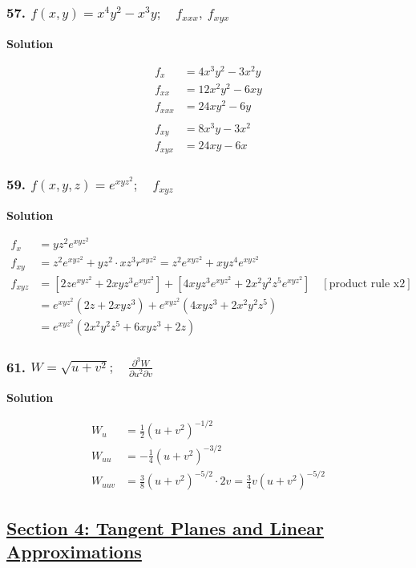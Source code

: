 \documentclass{article}
\newcommand{\solution}{\centerline{\textbf{Solution}}}
\begin{document}
\subsubsection*{57. $f(x,y) = x^4y^2 - x^3y;\quad f_{xxx},\: f_{xyx}$}
\solution
\begin{align*}
    f_x &= 4x^3y^2 - 3x^2y \\
    f_{xx} &= 12x^2y^2 - 6xy \\
    f_{xxx} &= 24xy^2 - 6y \\\\
    f_{xy} &= 8x^3y - 3x^2 \\
    f_{xyx} &= 24xy - 6x 
\end{align*}
\subsubsection*{59. $f(x,y,z) = e^{xyz^2}; \quad f_{xyz}$}
\solution
\begin{align*}
    f_x &= yz^2e^{xyz^2} \\
    f_{xy} &= z^2e^{xyz^2} + yz^2\cdot xz^3r^{xyz^2} = z^2e^{xyz^2} + xyz^4e^{xyz^2} \\
    f_{xyz} &= [2ze^{xyz^2} + 2xyz^3e^{xyz^2}] + [4xyz^3e^{xyz^2} + 2x^2y^2z^5e^{xyz^2}] \quad [\text{product rule x2}] \\
            &= e^{xyz^2}(2z+2xyz^3) + e^{xyz^2}(4xyz^3 + 2x^2y^2z^5) \\
            &= e^{xyz^2}(2x^2y^2z^5 + 6xyz^3 + 2z)
\end{align*}
\subsubsection*{61. $W = \sqrt{u + v^2}; \quad \displaystyle\frac{\partial^3 W}{\partial u^2 \partial v}$}
\solution
\begin{align*}
    W_u &= \frac{1}{2}(u+v^2)^{-1/2} \\
    W_{uu} &= -\frac 1 4 (u+v^2)^{-3/2} \\
    W_{uuv} &= \frac 3 8 (u+v^2)^{-5/2} \cdot 2v = \frac 3 4 v (u+v^2)^{-5/2}
\end{align*}
\newpage
\begin{center}
\section*{\underline{Section 4: Tangent Planes and Linear Approximations}}
\end{center}
\end{document}
